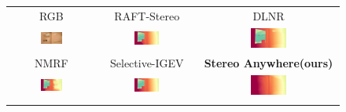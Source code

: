 \documentclass[10pt,twocolumn,letterpaper]{article}
\newcommand{\method}[0]{Stereo Anywhere\xspace}
\begin{document}
\begin{figure}[h]
\begin{tabular}{ccc}
        \small RGB &
        \small RAFT-Stereo \cite{lipson2021raft} &
        \small DLNR \cite{zhao2023high} \\
        \includegraphics[width=0.27\textwidth]{imgs/layeredflow/rgb/39.jpg} &
        \includegraphics[width=0.27\textwidth]{imgs/layeredflow/stereo/RAFT-Stereo/39.jpg} &
        \includegraphics[width=0.27\textwidth]{imgs/layeredflow/stereo/DLNR/39.jpg} \\
        \small NMRF \cite{guan2024neural} &
        \small Selective-IGEV \cite{wang2024selective} &
        \textbf{\method (ours)} \\
        \includegraphics[width=0.27\textwidth]{imgs/layeredflow/stereo/NMRF/39.jpg} &
        \includegraphics[width=0.27\textwidth]{imgs/layeredflow/stereo/Selective/39.jpg} &
        \includegraphics[width=0.27\textwidth]{imgs/layeredflow/stereo/Ours/39.jpg} \\ \\


\end{tabular}
\end{figure}
\end{document}
